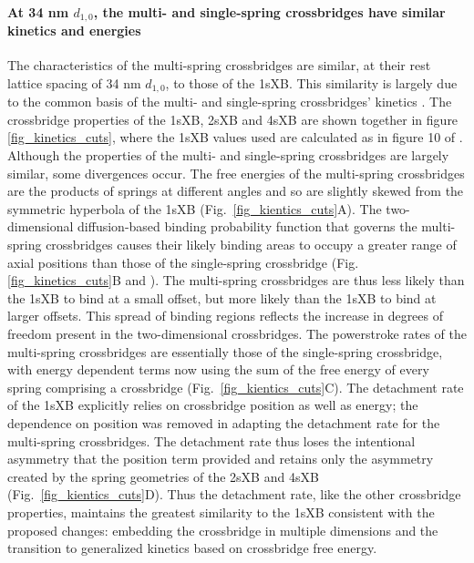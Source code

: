 \documentclass[]{article}
\begin{document}
\paragraph{At 34 nm $d_{1,0}$, the multi- and single-spring crossbridges have similar kinetics and energies} %
The characteristics of the multi-spring crossbridges are similar, at their rest lattice spacing of 34 nm $d_{1,0}$, to those of the 1sXB. 
This similarity is largely due to the common basis of the multi- and single-spring crossbridges' kinetics \citep{Pate1989}.
The crossbridge properties of the 1sXB, 2sXB and 4sXB are shown together in figure \ref{fig_kinetics_cuts}, where the 1sXB values used are calculated as in figure 10 of \citet{Tanner2007}. 
Although the properties of the multi- and single-spring crossbridges are largely similar, some divergences occur. 
The free energies of the multi-spring crossbridges are the products of springs at different angles and so are slightly skewed from the symmetric hyperbola of the 1sXB (Fig.~\ref{fig_kientics_cuts}A).
The two-dimensional diffusion-based binding probability function that governs the multi-spring crossbridges causes their likely binding areas to occupy a greater range of axial positions than those of the single-spring crossbridge (Fig.\ref{fig_kinetics_cuts}B and \citet{BergBook, DillBook}).
The multi-spring crossbridges are thus less likely than the 1sXB to bind at a small offset, but more likely than the 1sXB to bind at larger offsets. 
This spread of binding regions reflects the increase in degrees of freedom present in the two-dimensional crossbridges. 
The powerstroke rates of the multi-spring crossbridges are essentially those of the single-spring crossbridge, with energy dependent terms now using the sum of the free energy of every spring comprising a crossbridge (Fig.~\ref{fig_kientics_cuts}C). 
The detachment rate of the 1sXB explicitly relies on crossbridge position as well as energy; the dependence on position was removed in adapting the detachment rate for the multi-spring crossbridges. 
The detachment rate thus loses the intentional asymmetry that the position term provided and retains only the asymmetry created by the spring geometries of the 2sXB and 4sXB (Fig.~\ref{fig_kientics_cuts}D). 
Thus the detachment rate, like the other crossbridge properties, maintains the greatest similarity to the 1sXB consistent with the proposed changes: embedding the crossbridge in multiple dimensions and the transition to generalized kinetics based on crossbridge free energy. 
\end{document}
